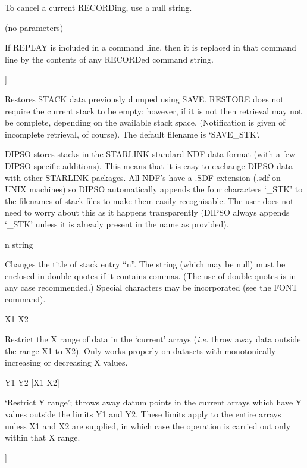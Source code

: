 \begin {description}
To cancel a current RECORDing, use a null string.

\item [REPLAY] (no parameters)

If REPLAY is included in a command line, then it is replaced in that
command line by the contents of any RECORDed command string.

\item [RESTORE] [filename[.typ]]

Restores STACK data previously dumped using SAVE. RESTORE does not
require the current stack to be empty; however, if it is not then
retrieval may not be complete, depending on the available stack space.
(Notification is given of incomplete retrieval, of course). The
default filename is `SAVE\_STK'.

DIPSO stores stacks in the STARLINK standard NDF data format (with a
few DIPSO specific additions). This means that it is easy to exchange
DIPSO data with other STARLINK packages. All NDF's have a .SDF
extension (.sdf on UNIX machines) so DIPSO automatically appends the
four characters `\_STK' to the filenames of stack files to make them
easily recognisable. The user does not need to worry about this as it
happens transparently (DIPSO always appends `\_STK' unless it is
already present in the name as provided).

\item [RETITLE] n string

Changes the title of stack entry ``n''. The string (which may be null)
must be enclosed in double quotes if it contains commas. (The use of
double quotes is in any case recommended.) Special characters may be
incorporated (see the FONT command).

\item [RXR] X1 X2

Restrict the X range of data in the `current' arrays ({\em i.e.} throw
away data outside the range X1 to X2). Only works properly on datasets
with monotonically increasing or decreasing X values.

\item [RYR] Y1 Y2 [X1 X2]

`Restrict Y range';  throws away datum points in the current arrays
which have Y values outside the limits Y1 and Y2. These limits apply
to the entire arrays unless X1 and X2 are supplied, in which case the
operation is carried out only within that X range.

\item [SAVE] [filename[.typ] [n1-n2]]


\end{description}
